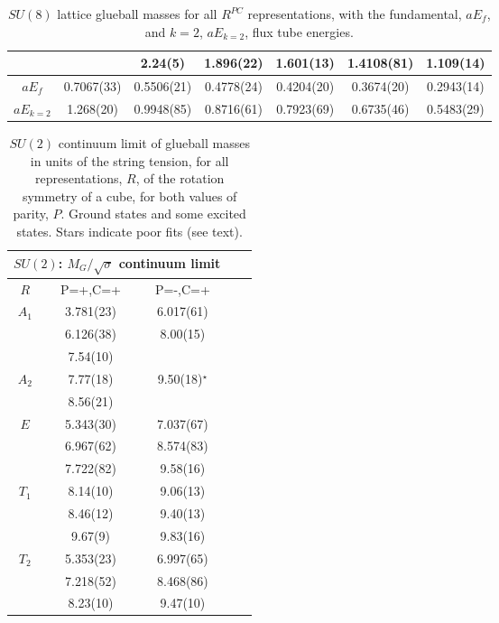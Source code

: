 \documentclass[12pt]{article}
\begin{document}
\begin{table}[htb]
\begin{tabular}{|c|c|c|c|c|c|c|}
          &         & 2.24(5)   & 1.896(22)  & 1.601(13) & 1.4108(81)  & 1.109(14)  \\ \hline \hline
$aE_f$    & 0.7067(33)  & 0.5506(21)  & 0.4778(24)  & 0.4204(20) & 0.3674(20)  & 0.2943(14)  \\ 
$aE_{k=2}$ & 1.268(20)  & 0.9948(85)  & 0.8716(61)  & 0.7923(69) & 0.6735(46)  & 0.5483(29)  \\ \hline
\end{tabular}
\caption{$SU(8)$ lattice glueball masses for all $R^{PC}$ representations, with
  the fundamental, $aE_f$, and $k=2$, $aE_{k=2}$, flux tube energies.} 
\label{table_Mlat_RPC_SU8}
\end{table}





\clearpage






\begin{table}[htb]
\centering
\begin{tabular}{|c|c|c|c|c|} \hline
\multicolumn{3}{|c|}{$SU(2)$: $M_G/\surd\sigma$  continuum limit} \\ \hline
  $R$   & P=+,C=+ & P=-,C=+     \\ \hline
$A_1$  &  3.781(23)  &  6.017(61)  \\
    &  6.126(38)  &  8.00(15)   \\ 
    &  7.54(10)   &             \\ \hline
$A_2$  &  7.77(18)   &  9.50(18)$^\star$ \\
    &  8.56(21)   &             \\ \hline
$E$   &  5.343(30)  &  7.037(67)  \\
    &  6.967(62)  &  8.574(83)  \\
    &  7.722(82)  &  9.58(16)   \\ \hline
$T_1$  &  8.14(10)   &  9.06(13)   \\
    &  8.46(12)   &  9.40(13)   \\
    &  9.67(9)    &  9.83(16)   \\ \hline
$T_2$  &  5.353(23)  &  6.997(65)  \\
    &  7.218(52)  &  8.468(86)  \\
    &  8.23(10)   &  9.47(10)   \\ \hline
\end{tabular}
\caption{$SU(2)$ continuum limit of glueball masses in units of the string tension,
  for all representations, $R$, of the rotation symmetry of a cube, for
  both values of parity, $P$.
  Ground states and some excited states. Stars
  indicate poor fits (see text).}
\label{table_MK_R_SU2}
\end{table}
\end{document}
